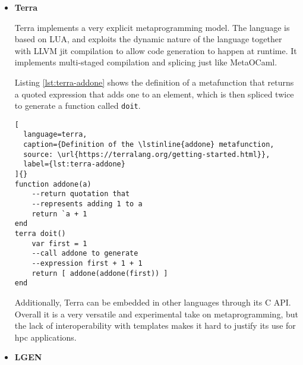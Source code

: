 \documentclass[../main]{subfiles}
\begin{document}
\begin{itemize}
Here we can find an example taken from The Rust Programming Language
book \cite{rust-book} where a simplified version of the \lstinline{vec!} macro,
which initializes a vector and pre-fills it with a static number of values,
is defined:

Listing \ref{lst:rust-vec-macro} shows how the \lstinline{vec!} standard macro
can be defined. Note that the Rust standard library preallocates

\begin{lstlisting}[
  language=rust,
  caption={Definition of the \lstinline{vec!} macro,
  source: \url{https://doc.rust-lang.org/stable/book/}},
  label={lst:rust-vec-macro}
]{}
#[macro_export]
macro_rules! vec {
  ( $( $x:expr ),* ) => {
    {
      let mut temp_vec = Vec::new();
      $(
        temp_vec.push($x);
      )*
      temp_vec
    }
  };
}
\end{lstlisting}

\item
\textbf{Terra}

Terra\cite{terra} implements a very explicit metaprogramming model.
The language is based on LUA, and exploits the dynamic nature of the language
together with LLVM \gls{jit} compilation to allow code generation
to happen at runtime.
It implements multi-staged compilation and splicing just like MetaOCaml.

Listing \ref{lst:terra-addone} shows the definition of a metafunction that
returns a quoted expression that adds one to an element, which is then spliced
twice to generate a function called \lstinline{doit}.

\begin{lstlisting}[
  language=terra,
  caption={Definition of the \lstinline{addone} metafunction,
  source: \url{https://terralang.org/getting-started.html}},
  label={lst:terra-addone}
]{}
function addone(a)
    --return quotation that
    --represents adding 1 to a
    return `a + 1
end
terra doit()
    var first = 1
    --call addone to generate
    --expression first + 1 + 1
    return [ addone(addone(first)) ]
end
\end{lstlisting}

Additionally, Terra can be embedded in other languages through its C API.
Overall it is a very versatile and experimental take on metaprogramming,
but the lack of interoperability with \cpp templates makes it hard to justify
its use for \gls{hpc} applications.

\item
\textbf{LGEN}


\end{itemize}
\end{document}
